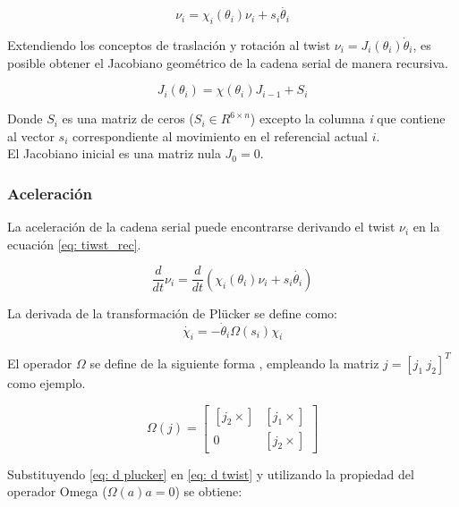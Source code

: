 \begin{equation} \label{eq: tiwst_rec}
\nu_i = \chi_i(\theta_i)\nu_i + s_i\dot{\theta_i}
\end{equation}

Extendiendo los conceptos de traslación y rotación al twist 
$  \nu_i = J_i( {\theta_i})  {\dot \theta_i}$, 
es posible obtener el Jacobiano geométrico 
de la cadena serial de manera recursiva. 

\begin{equation}
J_i(\theta_i) = \chi(\theta_i) J_{i-1} + S_i
\end{equation}

Donde $S_i$ es una matriz de ceros 
($S_i \in R^{6\times n}$) excepto la columna 
\emph{i} que contiene al vector $s_i$ correspondiente 
al movimiento en el referencial actual $i$.\\
El Jacobiano inicial es una matriz nula $J_0 = 0$.

\subsubsection{Aceleración}

La aceleración de la cadena serial puede 
encontrarse derivando el twist $\nu_i$ en la ecuación 
\eqref{eq: tiwst_rec}.

\begin{equation}\label{eq: d twist}
\dfrac{d}{dt} \nu_i = \frac{d}{dt} (\chi_i(\theta_i)\nu_i + s_i\dot{\theta_i})
\end{equation}

La derivada de la transformación de Plücker 
se define como:
\begin{equation}\label{eq: d plucker}
\dot{\chi_i} = -\dot \theta_i \Omega(s_i) \chi_i
\end{equation}

El operador $\Omega$ se define de la siguiente forma
\cite{olguin2019multibody}, empleando la matriz 
$  j = [  j_1 \   j_2]^T$
como ejemplo.

\begin{equation}\label{eq: Omega}
 \Omega(  j) = \begin{bmatrix}
           [  j_2 \times] & [  j_1 \times] \\
           0 & [  j_2 \times]
          \end{bmatrix}
\end{equation}

Substituyendo \eqref{eq: d plucker} 
en \eqref{eq: d twist} 
y utilizando la propiedad del operador Omega
($\Omega(  a)   a =0$)
\cite{olguin2019stewart}
se obtiene: 

